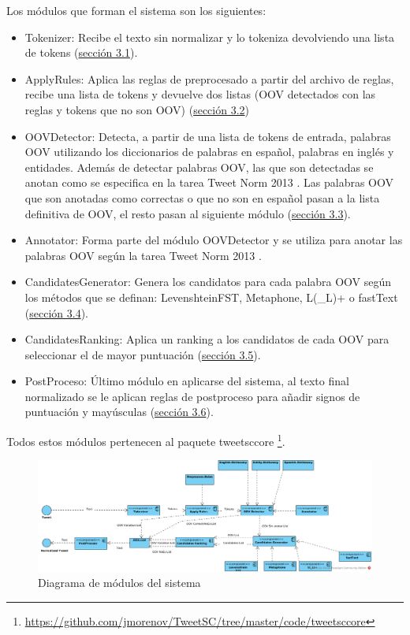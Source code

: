 \documentclass[spanish,12pt, a4paper,twoside]{paper}
\begin{document}
Los módulos que forman el sistema son los siguientes:
\begin{itemize}
	\item Tokenizer: Recibe el texto sin normalizar y lo tokeniza devolviendo una lista de tokens (\hyperref[sec:tokenizacion]{sección 3.1}).
	\item ApplyRules: Aplica las reglas de preprocesado a partir del archivo de reglas, recibe una lista de tokens y devuelve dos listas (OOV detectados con las reglas y tokens que no son OOV) (\hyperref[sec:reglasdepreprocesado]{sección 3.2})
	\item OOVDetector: Detecta, a partir de una lista de tokens de entrada, palabras OOV utilizando los diccionarios de palabras en español, palabras en inglés y entidades. Además de detectar palabras OOV, las que son detectadas se anotan como se especifica en la tarea Tweet Norm 2013 \cite{alegria:2013}. Las palabras OOV que son anotadas como correctas o que no son en español pasan a la lista definitiva de OOV, el resto pasan al siguiente módulo (\hyperref[sec:detecciondeoov]{sección 3.3}).
	\item Annotator: Forma parte del módulo OOVDetector y se utiliza para anotar las palabras OOV según la tarea Tweet Norm 2013 \cite{alegria:2013}.
	\item CandidatesGenerator: Genera los candidatos para cada palabra OOV según los métodos que se definan: LevenshteinFST, Metaphone, L(\_L)+ o fastText (\hyperref[sec:generaciondecandidatosoov]{sección 3.4}).
	\item CandidatesRanking: Aplica un ranking a los candidatos de cada OOV para seleccionar el de mayor puntuación (\hyperref[sec:rankingdecandidatos]{sección 3.5}).
	\item PostProceso: Último módulo en aplicarse del sistema, al texto final normalizado se le aplican reglas de postproceso para añadir signos de puntuación y mayúsculas (\hyperref[sec:postproceso]{sección 3.6}).
\end{itemize}
Todos estos módulos pertenecen al paquete tweetsccore \footnote{\url{https://github.com/jmorenov/TweetSC/tree/master/code/tweetsccore}}.

\begin{figure}[h]
 \includegraphics[width=1.2\textwidth]{recursos/DiagramaDelSistema.png}
\caption{Diagrama de módulos del sistema}
\label{fig:diagramadelsistema}
\end{figure}
\end{document}
